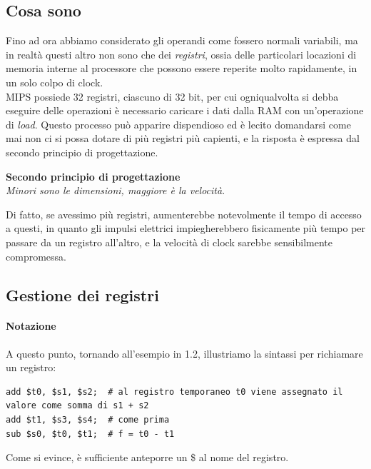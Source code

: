 \documentclass[class=book, crop=false]{standalone}
\begin{document}
\subsection*{Cosa sono}

Fino ad ora abbiamo considerato gli operandi come fossero normali variabili, ma in realtà questi altro non sono che dei \emph{registri}, ossia delle particolari locazioni di memoria interne al processore che possono essere reperite molto rapidamente, in un solo colpo di clock.\\

MIPS possiede 32 registri, ciascuno di 32 bit, per cui ogniqualvolta si debba eseguire delle operazioni è necessario caricare i dati dalla RAM con un'operazione di \emph{load}. Questo processo può apparire dispendioso ed è lecito domandarsi come mai non ci si possa dotare di più registri più capienti, e la risposta è espressa dal secondo principio di progettazione.

\vspace{8pt}
\begin{tcolorbox}
\centering
\textbf{Secondo principio di progettazione}\\
\emph{Minori sono le dimensioni, maggiore è la velocità}.
\end{tcolorbox}
\vspace{5pt}

Di fatto, se avessimo  più registri, aumenterebbe notevolmente il tempo di accesso a questi, in quanto gli impulsi elettrici impiegherebbero fisicamente più tempo per passare da un registro all'altro, e la velocità di clock sarebbe sensibilmente compromessa.

\subsection*{Gestione dei registri}

\paragraph{Notazione}
A questo punto, tornando all'esempio in 1.2, illustriamo la sintassi per richiamare un registro:
\begin{verbatim}
add $t0, $s1, $s2;  # al registro temporaneo t0 viene assegnato il valore come somma di s1 + s2
add $t1, $s3, $s4;  # come prima
sub $s0, $t0, $t1;  # f = t0 - t1
\end{verbatim}
Come si evince, è sufficiente anteporre un \$ al nome del registro.
\end{document}
